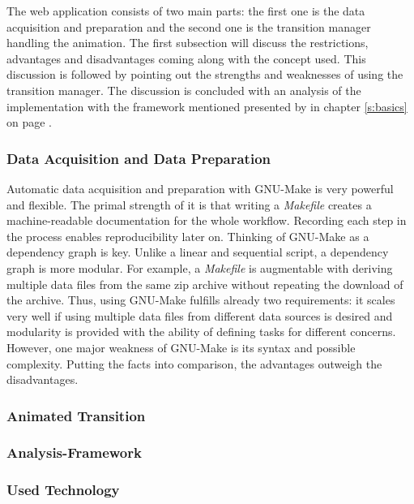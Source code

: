 The web application consists of two main parts: the first one is the data acquisition and preparation and the second one is the transition manager handling the animation. The first subsection will discuss the restrictions, advantages and disadvantages coming along with the concept used. This discussion is followed by pointing out the strengths and weaknesses of using the transition manager. The discussion is concluded with an analysis of the implementation with the framework mentioned presented by \citeauthor{Munzner2014} in chapter \ref{s:basics} on page \pageref{s:basics}.

\subsubsection{Data Acquisition and Data Preparation}
Automatic data acquisition and preparation with GNU-Make is very powerful and flexible. The primal strength of it is that writing a \textit{Makefile} creates a machine-readable documentation for the whole workflow. Recording each step in the process enables reproducibility later on.
Thinking of GNU-Make as a dependency graph is key. Unlike a linear and sequential script, a dependency graph is more modular. For example, a \textit{Makefile} is augmentable with deriving multiple data files from the same zip archive without repeating the download of the archive. Thus, using GNU-Make fulfills already two requirements: it scales very well if using multiple data files from different data sources is desired and modularity is provided with the ability of defining tasks for different concerns. However, one major weakness of GNU-Make is its syntax and possible complexity. Putting the facts into comparison, the advantages outweigh the disadvantages.


\subsubsection{Animated Transition}
%

\subsubsection{Analysis-Framework}

\subsubsection{Used Technology}
%